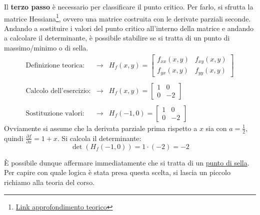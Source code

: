 \documentclass[a4paper]{article}
\begin{document}
	\noindent
	Il \textbf{terzo passo} è necessario per classificare il punto critico. Per farlo, si sfrutta la matrice Hessiana\footnote{\href{https://www.youmath.it/lezioni/analisi-due/varie/1150-massimi-e-minimi-funzioni-due-variabili.html}{Link approfondimento teorico}}, ovvero una matrice costruita con le derivate parziali seconde. Andando a sostituire i valori del punto critico all'interno della matrice e andando a calcolare il determinante, è possibile stabilire se si tratta di un punto di massimo/minimo o di sella.
	\begin{equation*}
		\begin{array}{rcl}
			\text{Definizione teorica:} &\longrightarrow& H_{f}\left(x,y\right) = \begin{bmatrix}
				f_{xx}\left(x,y\right)	& f_{xy}\left(x,y\right) \\
				f_{yx}\left(x,y\right)	& f_{yy}\left(x,y\right)
			\end{bmatrix} \\
			\\
			\text{Calcolo dell'esercizio:} &\longrightarrow& H_{f}\left(x,y\right) = \begin{bmatrix}
				1	& 0 \\
				0	& -2
			\end{bmatrix} \\
			\\
			\text{Sostituzione valori:} &\longrightarrow& H_{f}\left(-1, 0\right) = \begin{bmatrix}
				1	& 0 \\
				0	& -2
			\end{bmatrix}
		\end{array}
	\end{equation*}
	Ovviamente si assume che la derivata parziale prima rispetto a $x$ sia con $a = \frac{1}{2}$, quindi $\frac{\partial f}{\partial x} = 1+x$. Si calcola il determinante:
	\begin{equation*}
		\det\left(H_{f}\left(-1, 0\right)\right) = 1 \cdot \left(-2\right) = -2
	\end{equation*}\newpage

	\noindent
	È possibile dunque affermare immediatamente che si tratta di un \underline{punto di sella}. Per capire con quale logica è stata presa questa scelta, si lascia un piccolo richiamo alla teoria del corso.
\end{document}
